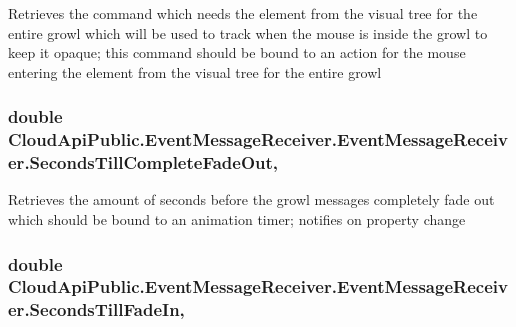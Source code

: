 Retrieves the command which needs the element from the visual tree for the entire growl which will be used to track when the mouse is inside the growl to keep it opaque; this command should be bound to an action for the mouse entering the element from the visual tree for the entire growl 

\hypertarget{class_cloud_api_public_1_1_event_message_receiver_1_1_event_message_receiver_acbc67b358faa248a4328980ba6fc958f}{
\subsubsection[{Seconds\-Till\-Complete\-Fade\-Out}]{\setlength{\rightskip}{0pt plus 5cm}double Cloud\-Api\-Public.\-Event\-Message\-Receiver.\-Event\-Message\-Receiver.\-Seconds\-Till\-Complete\-Fade\-Out\hspace{0.3cm}{\ttfamily [get]}, {\ttfamily [set]}}}\label{class_cloud_api_public_1_1_event_message_receiver_1_1_event_message_receiver_acbc67b358faa248a4328980ba6fc958f}


Retrieves the amount of seconds before the growl messages completely fade out which should be bound to an animation timer; notifies on property change 

\hypertarget{class_cloud_api_public_1_1_event_message_receiver_1_1_event_message_receiver_a9f93b9413622329023074e2974c5c7f1}{
\subsubsection[{Seconds\-Till\-Fade\-In}]{\setlength{\rightskip}{0pt plus 5cm}double Cloud\-Api\-Public.\-Event\-Message\-Receiver.\-Event\-Message\-Receiver.\-Seconds\-Till\-Fade\-In\hspace{0.3cm}{\ttfamily [get]}, {\ttfamily [set]}}}\label{class_cloud_api_public_1_1_event_message_receiver_1_1_event_message_receiver_a9f93b9413622329023074e2974c5c7f1}


